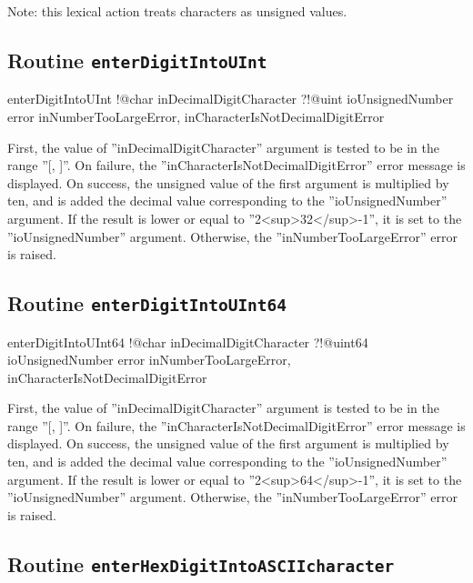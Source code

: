 {Note: this lexical action treats characters as unsigned values.

\subsection{Routine \texttt{enterDigitIntoUInt}}

\begin{galgascode}
enterDigitIntoUInt !@char inDecimalDigitCharacter
                   ?!@uint ioUnsignedNumber
                   error inNumberTooLargeError,
                         inCharacterIsNotDecimalDigitError
\end{galgascode}

First, the value of ''inDecimalDigitCharacter'' argument is tested to be in the range ''[\textquotesingle, \textquotesingle]''. On failure, the ''inCharacterIsNotDecimalDigitError'' error message is displayed. On success, the unsigned value of the first argument is multiplied by ten, and is added the decimal value corresponding to the ''ioUnsignedNumber'' argument. If the result is lower or equal to ''2<sup>32</sup>-1'', it is set to the ''ioUnsignedNumber'' argument. Otherwise, the ''inNumberTooLargeError'' error is raised.

\subsection{Routine \texttt{enterDigitIntoUInt64}}

\begin{galgascode}
enterDigitIntoUInt64 !@char inDecimalDigitCharacter
                     ?!@uint64 ioUnsignedNumber
                     error inNumberTooLargeError,
                           inCharacterIsNotDecimalDigitError
\end{galgascode}

First, the value of ''inDecimalDigitCharacter'' argument is tested to be in the range ''[\textquotesingle, \textquotesingle]''. On failure, the ''inCharacterIsNotDecimalDigitError'' error message is displayed. On success, the unsigned value of the first argument is multiplied by ten, and is added the decimal value corresponding to the ''ioUnsignedNumber'' argument. If the result is lower or equal to ''2<sup>64</sup>-1'', it is set to the ''ioUnsignedNumber'' argument. Otherwise, the ''inNumberTooLargeError'' error is raised.

\subsection{Routine \texttt{enterHexDigitIntoASCIIcharacter}}

}
